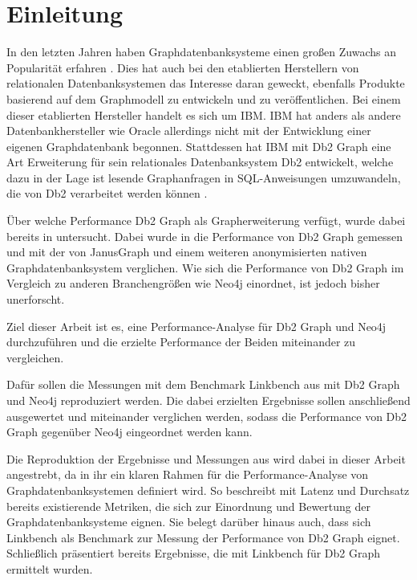 \chapter{Einleitung}
\label{einleitung}

In den letzten Jahren haben Graphdatenbanksysteme einen großen Zuwachs an Popularität erfahren \cite{db_engines_ranking_july}. Dies hat auch bei den etablierten Herstellern von relationalen Datenbanksystemen das Interesse daran geweckt, ebenfalls Produkte basierend auf dem Graphmodell zu entwickeln und zu veröffentlichen. Bei einem dieser etablierten Hersteller handelt es sich um IBM. IBM hat anders als andere Datenbankhersteller wie Oracle allerdings nicht mit der Entwicklung einer eigenen Graphdatenbank begonnen. Stattdessen hat IBM mit Db2 Graph eine Art Erweiterung für sein relationales Datenbanksystem Db2 entwickelt, welche dazu in der Lage ist lesende Graphanfragen in SQL-Anweisungen umzuwandeln, die von Db2 verarbeitet werden können \cite{sigmod_tian}. 

Über welche Performance Db2 Graph als Grapherweiterung verfügt, wurde dabei bereits in \cite{sigmod_tian} untersucht. Dabei wurde in \cite{sigmod_tian} die Performance von Db2 Graph gemessen und mit der von JanusGraph und einem weiteren anonymisierten nativen Graphdatenbanksystem verglichen. Wie sich die Performance von Db2 Graph im Vergleich zu anderen Branchengrößen wie Neo4j einordnet, ist jedoch bisher unerforscht. 

Ziel dieser Arbeit ist es, eine Performance-Analyse für Db2 Graph und Neo4j durchzuführen und die erzielte Performance der Beiden miteinander zu vergleichen.

Dafür sollen die Messungen mit dem Benchmark Linkbench aus \cite{sigmod_tian} mit Db2 Graph und Neo4j reproduziert werden. Die dabei erzielten Ergebnisse sollen anschließend ausgewertet und miteinander verglichen werden, sodass die Performance von Db2 Graph gegenüber Neo4j eingeordnet werden kann.

Die Reproduktion der Ergebnisse und Messungen aus \cite{sigmod_tian} wird dabei in dieser Arbeit angestrebt, da in ihr ein klaren Rahmen für die Performance-Analyse von Graphdatenbanksystemen definiert wird. So beschreibt \cite{sigmod_tian} mit Latenz und Durchsatz bereits existierende Metriken, die sich zur Einordnung und Bewertung der Graphdatenbanksysteme eignen. Sie belegt darüber hinaus auch, dass sich Linkbench als Benchmark zur Messung der Performance von Db2 Graph eignet. Schließlich präsentiert \cite{sigmod_tian} bereits Ergebnisse, die mit Linkbench für Db2 Graph ermittelt wurden. 

